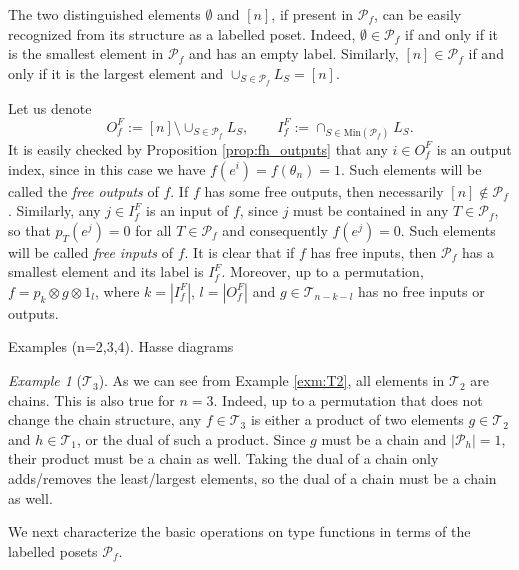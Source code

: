 \documentclass[12pt]{article}
\theoremstyle{definition}
\theoremstyle{remark}
\newtheorem{exm}{Example}
\def\Te{\mathcal T}
\def\Pe{\mathcal P}
\begin{document}
The  two distinguished elements $\emptyset$ and $[n]$, if present in $\Pe_f$, can be easily recognized
from its structure as a labelled poset. Indeed, $\emptyset\in \Pe_f$ if and only if it is
the smallest element in $\Pe_f$ and has an empty label. Similarly, $[n]\in \Pe_f$ if and
only if it is the largest element and $\cup_{S\in \Pe_f}L_S=[n]$. 


Let us denote
\[
O_f^F:=[n]\setminus
\cup_{S\in \Pe_f}L_S, \qquad I_f^F:=\cap_{S\in \mathrm{Min}(\Pe_f)} L_S.
\]
It is easily checked by Proposition \ref{prop:fh_outputs} that any  $i\in O_f^F$ is an
output index, since in this case  we have
$f(e^i)=f(\theta_n)=1$. Such elements will be called
the {\em free outputs} of $f$. If $f$ has some free outputs, then necessarily $[n]\notin
\Pe_f$. Similarly, any  $j\in I_f^F$ is an input of $f$, since $j$ must be
contained in any $T\in \Pe_f$, so that $p_T(e^j)=0$ for all $T\in \Pe_f$ and consequently
$f(e^j)=0$. Such elements will be called {\em free
inputs} of $f$. It is clear that if $f$ has free inputs, then $\Pe_f$ has a smallest
element and its label is $I_f^F$. Moreover, up to a permutation, $f=p_k\otimes g\otimes
1_l$, where
$k=|I_f^F|$, $l=|O_f^F|$  and $g\in \Te_{n-k-l}$ has no free inputs or outputs.





Examples (n=2,3,4). Hasse diagrams
\begin{exm}[$\Te_3$]
As we can see from Example \ref{exm:T2}, all elements in $\Te_2$ are chains. This is
also true for $n=3$. Indeed, up to a permutation that does not change the chain structure, 
any $f\in \Te_3$ is either a product of two elements $g\in \Te_2$ and $h\in \Te_1$,
or the dual of such a  product. Since $g$ must be a chain and $|\Pe_h|=1$, their product
must be a chain as well. Taking the dual of a chain only adds/removes the least/largest
elements, so the dual of a chain must be a chain as well.
\end{exm}


We next characterize the basic operations on type functions  in terms of the labelled
posets $\Pe_f$.
\end{document}
